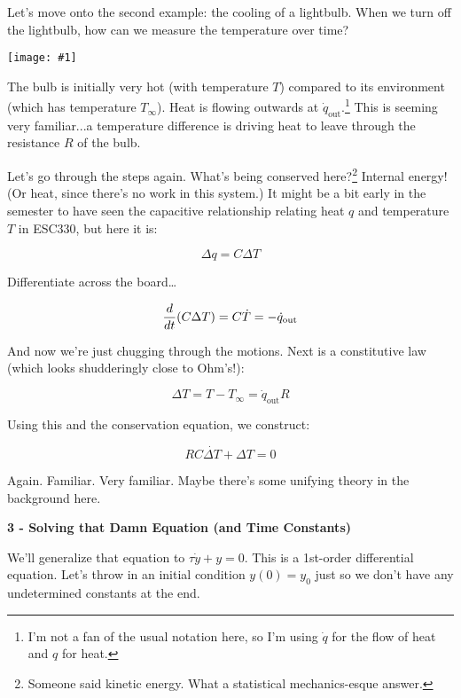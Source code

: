 \documentclass{article}
\newcommand{\bicture}[1]{\begin{center}
    {\texttt{[image: \#1]}}
\end{center}}
\begin{document}
\begin{onehalfspacing}
\begin{flushleft}
\medskip

Let's move onto the second example: the cooling of a lightbulb. When we turn off the lightbulb, how can we measure the temperature over time?

\bicture{1_sys2}

The bulb is initially very hot (with temperature \(T\)) compared to its environment (which has temperature \(T_\infty\)). Heat is flowing outwards at \(\dot{q}_\text{out}\).\footnote[1]{I'm not a fan of the usual notation here, so I'm using \(\dot{q}\) for the flow of heat and \(q\) for heat.} This is seeming very familiar...a temperature difference is driving heat to leave through the resistance \(R\) of the bulb.

\medskip

Let's go through the steps again. What's being conserved here?\footnote[2]{Someone said kinetic energy. What a statistical mechanics-esque answer.} Internal energy! (Or heat, since there's no work in this system.) It might be a bit early in the semester to have seen the capacitive relationship relating heat \(q\) and temperature \(T\) in ESC330, but here it is:

\vspace{-0.1in}
\[\Delta q = C \Delta T\]

Differentiate across the board\dots

\vspace{-0.1in}
\[\frac{d}{dt} \qty(C \Delta T) = C\dot{T} = -\dot{q}_\text{out}\]

And now we're just chugging through the motions. Next is a constitutive law (which looks shudderingly close to Ohm's!):

\vspace{-0.1in}
\[\Delta T = T - T_\infty = \dot{q}_\text{out} R\]

Using this and the conservation equation, we construct:

\vspace{-0.1in}
\[\boxed{RC \dot{\Delta T} + \Delta T = 0}\]

Again. Familiar. Very familiar. Maybe there's some unifying theory in the background here.

\bigskip
\large\textbf{3 - Solving that Damn Equation (and Time Constants)} \\
\normalsize

We'll generalize that equation to \(\tau \dot{y} + y = 0\). This is a 1st-order differential equation. Let's throw in an initial condition \(y(0)=y_0\) just so we don't have any undetermined constants at the end.


\end{flushleft}
\end{onehalfspacing}
\end{document}
